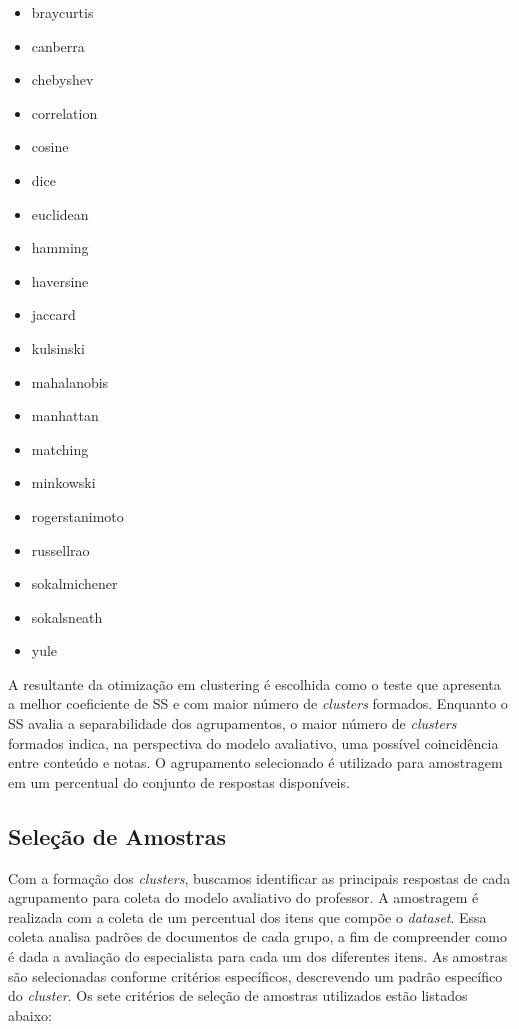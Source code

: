 \begin{minipage}{0.45\textwidth}
    \begin{itemize}
      \item braycurtis
      \item canberra
      \item chebyshev
      \item correlation
      \item cosine
      \item dice
      \item euclidean
      \item hamming
      \item haversine
      \item jaccard
    \end{itemize}
\end{minipage} %

\begin{minipage}{0.45\textwidth}
    \begin{itemize}
      \item kulsinski
      \item mahalanobis
      \item manhattan
      \item matching
      \item minkowski
      \item rogerstanimoto
      \item russellrao
      \item sokalmichener
      \item sokalsneath
      \item yule
\end{itemize}
\end{minipage}

A resultante da otimização em clustering é escolhida como o teste que apresenta a melhor coeficiente de SS e com maior número de \textit{clusters} formados. Enquanto o SS avalia a separabilidade dos agrupamentos, o maior número de \textit{clusters} formados indica, na perspectiva do modelo avaliativo, uma possível coincidência entre conteúdo e notas. O agrupamento selecionado é utilizado para amostragem em um percentual do conjunto de respostas disponíveis. 


\subsection{Seleção de Amostras}

Com a formação dos \textit{clusters}, buscamos identificar as principais respostas de cada agrupamento para coleta do modelo avaliativo do professor. A amostragem é realizada com a coleta de um percentual dos itens que compõe o \textit{dataset}. Essa coleta analisa padrões de documentos de cada grupo, a fim de compreender como é dada a avaliação do especialista para cada um dos diferentes itens. As amostras são selecionadas conforme critérios específicos, descrevendo um padrão específico do \textit{cluster}. Os sete critérios de seleção de amostras utilizados estão listados abaixo:

